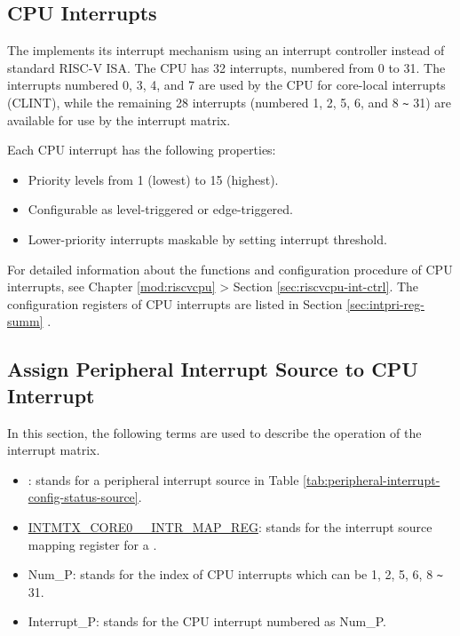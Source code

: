 \documentclass[main\_\_EN.tex]{subfiles}
\begin{document}
\clearpage
{}
\begin{landscape}

\end{landscape}
\restoregeometry
\clearpage

\subsection{CPU Interrupts}

The \chipname{} implements its interrupt mechanism using an interrupt controller instead of standard RISC-V ISA. The CPU has 32 interrupts, numbered from 0 to 31. The interrupts numbered 0, 3, 4, and 7 are used by the CPU for core-local interrupts (CLINT), while the remaining 28 interrupts (numbered 1, 2, 5, 6, and 8 \verb+~+ 31) are available for use by the interrupt matrix.

Each CPU interrupt has the following properties:
\begin{itemize}
    \item Priority levels from 1 (lowest) to 15 (highest).
    \item Configurable as level-triggered or edge-triggered.
    \item Lower-priority interrupts maskable by setting interrupt threshold.
\end{itemize}

\begin{tiplisting}
For detailed information about the functions and configuration procedure of CPU interrupts, see Chapter \ref{mod:riscvcpu} \textit{} > Section \ref{sec:riscvcpu-int-ctrl}\textit{}. The configuration registers of CPU interrupts are listed in Section \ref{sec:intpri-reg-summ} \textit{}.
\end{tiplisting}
\vspace{-1em}

\subsection{Assign Peripheral Interrupt Source to CPU Interrupt}

In this section, the following terms are used to describe the operation of the interrupt matrix.

\begin{itemize}

\item {}: stands for a peripheral interrupt source in Table \ref{tab:peripheral-interrupt-config-status-source}.

\item \hyperref[INTMTXCORE0SOURCEINTRMAPREG]{INTMTX\_CORE0\_\_INTR\_MAP\_REG}: stands for the interrupt source mapping register for a .

\item Num\_P: stands for the index of CPU interrupts which can be 1, 2, 5, 6, 8 \verb+~+ 31.
\item Interrupt\_P: stands for the CPU interrupt numbered as Num\_P.
\end{itemize}
\end{document}
